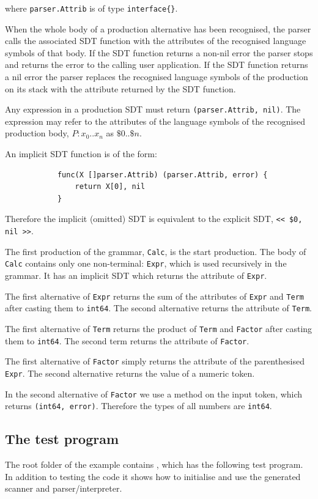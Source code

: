 \documentclass[12pt]{article}
\begin{document}
		where \verb|parser.Attrib| is of type \verb|interface{}|.

		When the whole body of a production alternative has been recognised, the parser calls the associated SDT function with the attributes of the recognised language symbols of that body. If the SDT function returns a non-nil error the parser stops and returns the error to the calling user application. If the SDT function returns a nil error the parser replaces the recognised language symbols of the production on its stack with the attribute returned by the SDT function.

		Any expression in a production SDT must return \verb|(parser.Attrib, nil)|. The expression may refer to the attributes of the language symbols of the recognised production body, $P : x_0 .. x_n$ as $\$0 .. \$n$.

		An implicit SDT function is of the form:

		\begin{verbatim}
			func(X []parser.Attrib) (parser.Attrib, error) {
			    return X[0], nil
			}
		\end{verbatim}

		Therefore the implicit (omitted) SDT is equivalent to the explicit SDT, \verb|<< $0, nil >>|.


		The first production of the grammar, \verb|Calc|,  is the start production. The body of \verb|Calc| contains only one non-terminal: \verb|Expr|, which is used recursively in the grammar. It has an implicit SDT which returns the attribute of \verb|Expr|.

		The first alternative of \verb|Expr| returns the sum of the attributes of \verb|Expr| and \verb|Term| after casting them to \verb|int64|. The second alternative returns the attribute of \verb|Term|.

		The first alternative of \verb|Term| returns the product of \verb|Term| and \verb|Factor| after casting them to \verb|int64|. The second term returns the attribute of \verb|Factor|.

		The first alternative of \verb|Factor| simply returns the attribute of the parenthesised \verb|Expr|. The second alternative returns the value of a numeric token.

		In the second alternative of \verb|Factor| we use a method on the input token, which returns 
		\verb|(int64, error)|. Therefore the types of all numbers are \verb|int64|.

	\subsection{The test program}
		The root folder of the  example contains , which has the following test program. In addition to testing the code it shows how to initialise and use the generated scanner and parser/interpreter.
\end{document}

